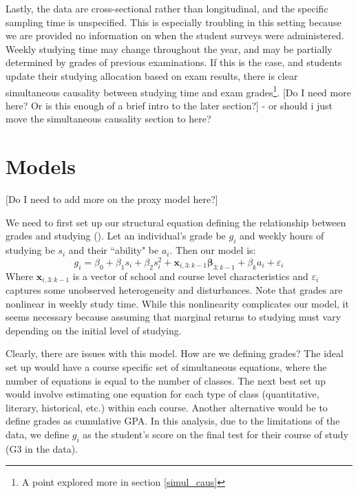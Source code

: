 \documentclass[12pt]{article}
\begin{document}
Lastly, the data are cross-sectional rather than longitudinal, and the specific sampling time is unspecified. This is especially troubling in this setting because we are provided no information on when the student surveys were administered. Weekly studying time may change throughout the year, and may be partially determined by grades of previous examinations. If this is the case, and students update their studying allocation based on exam results, there is clear simultaneous causality between studying time and exam grades\footnote{A point explored more in section \ref{simul_caus}}. 
\textcolor{BrickRed}{[Do I need more here? Or is this enough of a brief intro to the later section?] - or should i just move the simultaneous causality section to here?}


\newpage
\section{Models} \label{models}
\textcolor{BrickRed}{[Do I need to add more on the proxy model here?]}

We need to first set up our structural equation defining the relationship between grades and studying (\cite{CardKrueger}). Let an individual's grade be $g_i$ and weekly hours of studying be $s_i$ and their ``ability" be $a_i$. Then our model is:
$$
g_i = \beta_0 + \beta_1 s_i + \beta_2 s_i^2  + \bm{x}_{i,3:k-1}\bm{\beta}_{3:k-1} + \beta_k a_i + \varepsilon_i
$$
Where $\bm{x}_{i,3:k-1}$ is a vector of school and course level characteristics and $\varepsilon_i$ captures some unobserved heterogeneity and disturbances. Note that grades are nonlinear in weekly study time. While this nonlinearity complicates our model, it seems necessary because assuming that marginal returns to studying must vary depending on the initial level of studying.

Clearly, there are issues with this model. How are we defining grades? The ideal set up would have a course specific set of simultaneous equations, where the number of equations is equal to the number of classes. The next best set up would involve estimating one equation for each type of class (quantitative, literary, historical, etc.) within each course. Another alternative would be to define grades as cumulative GPA. In this analysis, due to the limitations of the data, we define $g_i$ as the student's score on the final test for their course of study (G3 in the data).
\end{document}
